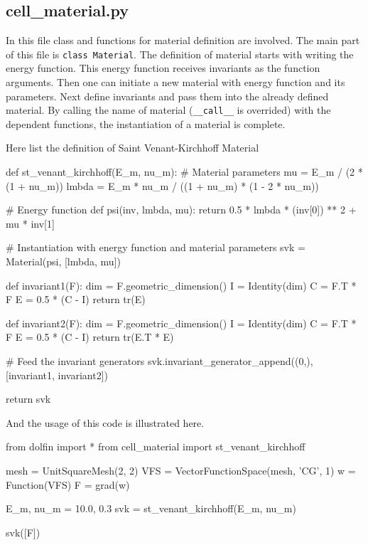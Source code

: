 \subsection{cell\_material.py}
In this file class and functions for material definition are involved. The main part of this file is \texttt{class Material}. The definition of material starts with writing the energy function. This energy function receives invariants as the function arguments. Then one can initiate a new material with energy function and its parameters. Next define invariants and pass them into the already defined material. By calling the name of material (\texttt{\_\_call\_\_} is overrided) with the dependent functions, the instantiation of a material is complete.

Here list the definition of Saint Venant-Kirchhoff Material

\begin{python}
def st_venant_kirchhoff(E_m, nu_m):
	# Material parameters
    mu = E_m / (2 * (1 + nu_m))
    lmbda = E_m * nu_m / ((1 + nu_m) * (1 - 2 * nu_m))

	# Energy function
    def psi(inv, lmbda, mu):
        return 0.5 * lmbda * (inv[0]) ** 2 + mu * inv[1]

	# Instantiation with energy function and material parameters
    svk = Material(psi, [lmbda, mu])

    def invariant1(F):
        dim = F.geometric_dimension()
        I = Identity(dim)
        C = F.T * F
        E = 0.5 * (C - I)
        return tr(E)

    def invariant2(F):
        dim = F.geometric_dimension()
        I = Identity(dim)
        C = F.T * F
        E = 0.5 * (C - I)
        return tr(E.T * E)
	
	# Feed the invariant generators
    svk.invariant_generator_append((0,), [invariant1, invariant2])

    return svk
\end{python}

And the usage of this code is illustrated here.
\begin{python}
from dolfin import *
from cell_material import st_venant_kirchhoff

mesh = UnitSquareMesh(2, 2)
VFS = VectorFunctionSpace(mesh, 'CG', 1)
w = Function(VFS)
F = grad(w)

E_m, nu_m = 10.0, 0.3
svk = st_venant_kirchhoff(E_m, nu_m)

svk([F])
\end{python}


